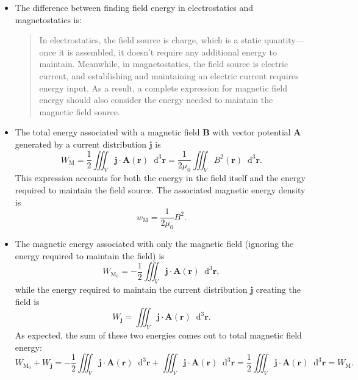\documentclass[11pt, a4paper]{article}
\newcommand{\diff}{\mathop{}\!\mathrm{d}} %
\newcommand{\dr}{\diff^{3} \r}  %
\renewcommand{\vec}[1]{\bm{#1}} %
\renewcommand{\r}{\vec{r}}
\newcommand{\B}{\vec{B}} %
\newcommand{\A}{\vec{A}} %
\newcommand{\mm}{\mu_{0}}  %
\renewcommand{\j}{\vec{j}}  %
\begin{document}
\begin{itemize}
    \item The difference between finding field energy in electrostatics and magnetostatics is:
    \begin{quote}
        In electrostatics, the field source is charge, which is a static quantity---once it is assembled, it doesn't require any additional energy to maintain. Meanwhile, in magnetostatics, the field source is electric current, and establishing and maintaining an electric current requires energy input. As a result, a complete expression for magnetic field energy should also consider the energy needed to maintain the magnetic field source.
    \end{quote}

    \item The total energy associated with a magnetic field $ \B $ with vector potential $ \A $ generated by a current distribution $ \j $ is
    \begin{equation*}
        W_{\text{M}} = \frac{1}{2} \iiint_{V} \j \cdot \A(\r) \dr = \frac{1}{2 \mm} \iiint_{V} B^{2}(\r) \dr.
    \end{equation*}
    This expression accounts for both the energy in the field itself and the energy required to maintain the field source. The associated magnetic energy density is
    \begin{equation*}
        w_{\text{M}} = \frac{1}{2 \mm} B^{2}.
    \end{equation*}

    \item The magnetic energy associated with only the magnetic field (ignoring the energy required to maintain the field) is
    \begin{equation*}
        W_{\text{M}_{0}} = -\frac{1}{2} \iiint_{V} \j \cdot \A(\r) \dr,
    \end{equation*}
    while the energy required to maintain the current distribution $ \j $ creating the field is
    \begin{equation*}
        W_{\j} = \iiint_{V} \j \cdot \A(\r) \dr.
    \end{equation*}
    As expected, the sum of these two energies comes out to total magnetic field energy:
    \begin{equation*}
        W_{\text{M}_{0}} + W_{\j} = -\frac{1}{2} \iiint_{V} \j \cdot \A(\r) \dr + \iiint_{V} \j \cdot \A(\r) \dr = \frac{1}{2} \iiint_{V} \j \cdot \A(\r) \dr = W_{\text{M}}.
    \end{equation*}
    
\end{itemize}
\end{document}
